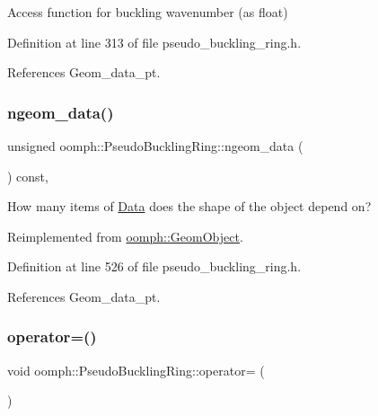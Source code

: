 Access function for buckling wavenumber (as float) 



Definition at line 313 of file pseudo\+\_\+buckling\+\_\+ring.\+h.



References Geom\+\_\+data\+\_\+pt.

\mbox{\label{classoomph_1_1PseudoBucklingRing_a9e03780134886a9a2a19358519eca3be}} 
\subsubsection{\texorpdfstring{ngeom\+\_\+data()}{ngeom\_data()}}
{\footnotesize\ttfamily unsigned oomph\+::\+Pseudo\+Buckling\+Ring\+::ngeom\+\_\+data (\begin{DoxyParamCaption}{ }\end{DoxyParamCaption}) const\hspace{0.3cm}{\ttfamily [inline]}, {\ttfamily [virtual]}}



How many items of \hyperlink{classoomph_1_1Data}{Data} does the shape of the object depend on? 



Reimplemented from \hyperlink{classoomph_1_1GeomObject_a19d325347e19964e127fe124df56f251}{oomph\+::\+Geom\+Object}.



Definition at line 526 of file pseudo\+\_\+buckling\+\_\+ring.\+h.



References Geom\+\_\+data\+\_\+pt.

\mbox{\label{classoomph_1_1PseudoBucklingRing_ab166806a7f1f28de1ecfb625d9a3ab0e}} 
\subsubsection{\texorpdfstring{operator=()}{operator=()}}
{\footnotesize\ttfamily void oomph\+::\+Pseudo\+Buckling\+Ring\+::operator= (\begin{DoxyParamCaption}\item[{const \hyperlink{classoomph_1_1PseudoBucklingRing}{Pseudo\+Buckling\+Ring} \&}]{ }\end{DoxyParamCaption})\hspace{0.3cm}{\ttfamily [inline]}}



